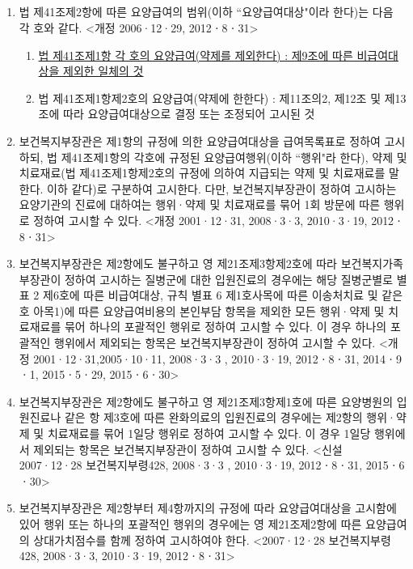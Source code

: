\subsection{}
\begin{enumerate}[①]\tightlist
\item 법 제41조제2항에 따른 \large{요양급여의 범위(이하 ``요양급여대상"이라 한다)는 다음 각 호와 같다.} <개정 2006·12·29, 2012ㆍ8ㆍ31>
	\begin{enumerate}[1.]\tightlist
	\item \uline{법 제41조제1항 각 호의 요양급여(약제를 제외한다) : 제9조에 따른 비급여대상을 제외한 일체의 것}
	\item 법 제41조제1항제2호의 요양급여(약제에 한한다) : 제11조의2, 제12조 및 제13조에 따라 요양급여대상으로 결정 또는 조정되어 고시된 것
	\end{enumerate}
\item 보건복지부장관은 제1항의 규정에 의한 요양급여대상을 급여목록표로 정하여 고시하되, 법 제41조제1항의 각호에 규정된 요양급여행위(이하 ``행위"라 한다), 약제 및 치료재료(법 제41조제1항제2호의 규정에 의하여 지급되는 약제 및 치료재료를 말한다. 이하 같다)로 구분하여 고시한다. 다만, 보건복지부장관이 정하여 고시하는 요양기관의 진료에 대하여는 행위·약제 및 치료재료를 묶어 1회 방문에 따른 행위로 정하여 고시할 수 있다. <개정 2001·12·31, 2008·3·3, 2010·3·19, 2012ㆍ8ㆍ31>
\item 보건복지부장관은 제2항에도 불구하고 영 제21조제3항제2호에 따라 보건복지가족부장관이 정하여 고시하는 질병군에 대한 입원진료의 경우에는 해당 질병군별로 별표 2 제6호에 따른 비급여대상, 규칙 별표 6 제1호사목에 따른 이송처치료 및 같은 호 아목1)에 따른 요양급여비용의 본인부담 항목을 제외한 모든 행위·약제 및 치료재료를 묶어 하나의 포괄적인 행위로 정하여 고시할 수 있다. 이 경우 하나의 포괄적인 행위에서 제외되는 항목은 보건복지부장관이 정하여 고시할 수 있다. <개정 2001·12·31,2005·10·11, 2008·3·3 , 2010·3·19, 2012ㆍ8ㆍ31, 2014ㆍ9ㆍ1, 2015ㆍ5ㆍ29, 2015ㆍ6ㆍ30>
\item 보건복지부장관은 제2항에도 불구하고 영 제21조제3항제1호에 따른 요양병원의 입원진료나 같은 항 제3호에 따른 완화의료의 입원진료의 경우에는 제2항의 행위·약제 및 치료재료를 묶어 1일당 행위로 정하여 고시할 수 있다. 이 경우 1일당 행위에서 제외되는 항목은 보건복지부장관이 정하여 고시할 수 있다. <신설 2007·12·28 보건복지부령428, 2008·3·3 , 2010·3·19, 2012ㆍ8ㆍ31, 2015ㆍ6ㆍ30>
\item 보건복지부장관은 제2항부터 제4항까지의 규정에 따라 요양급여대상을 고시함에 있어 행위 또는 하나의 포괄적인 행위의 경우에는 영 제21조제2항에 따른 요양급여의 상대가치점수를 함께 정하여 고시하여야 한다. <2007·12·28 보건복지부령428, 2008·3·3, 2010·3·19, 2012ㆍ8ㆍ31>
\end{enumerate}  
